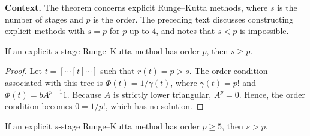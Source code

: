 \noindent\textbf{Context.}
The theorem concerns explicit Runge--Kutta methods, where $s$ is the number of stages and $p$ is the order. The preceding text discusses constructing explicit methods with $s = p$ for $p$ up to $4$, and notes that $s < p$ is impossible.

\begin{theorem}

  \label{thm:324A}
If an explicit $s$-stage Runge--Kutta method has order $p$, then
$s \geq p$.
\end{theorem}

\begin{proof}
Let $t = [\cdots[t]\cdots]$ such that $r(t) = p > s$. The order condition
associated with this tree is $\Phi(t) = 1/\gamma(t)$, where $\gamma(t) = p!$ and $\Phi(t) = b A^{p-1} 1$.
Because $A$ is strictly lower triangular, $A^{p} = 0$. Hence, the order condition
becomes $0 = 1/p!$, which has no solution.
\end{proof}

\begin{theorem}

  \label{thm:324B}
If an explicit $s$-stage Runge--Kutta method has order $p \geq 5$,
then $s > p$.
\end{theorem}

